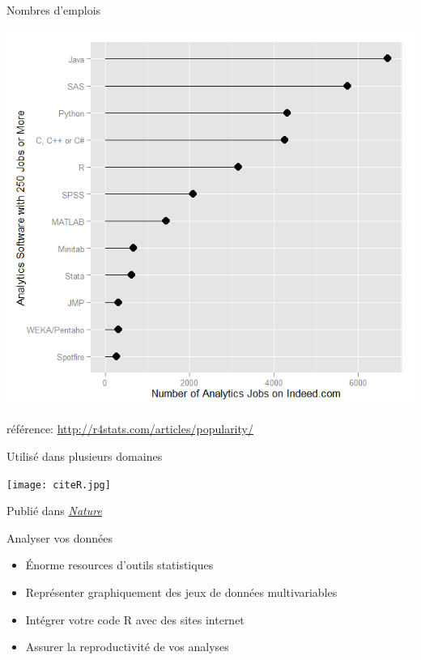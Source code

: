 \documentclass[11pt]{beamer}\usepackage[]{graphicx}\usepackage[]{color}
\begin{document}
\begin{frame}{Nombres d'emplois}

\begin{center}
\includegraphics[scale=0.47]{jobs.png}
\end{center}

\vspace{0.05in}

r\'{e}f\'{e}rence: \href{http://r4stats.com/articles/popularity/}{http://r4stats.com/articles/popularity/}\\

\end{frame}



\begin{frame}{Utilis\'{e} dans plusieurs domaines}

\begin{center}
\texttt{[image: citeR.jpg]}
\end{center}

\vspace{0.05in}

Publi\'{e} dans \href{http://www.nature.com/news/programming-tools-adventures-with-r-1.16609}{\textit{Nature}}
\end{frame}


\begin{frame}{Analyser vos données}
\begin{itemize}
  \setlength\itemsep{2em}
\item \'{E}norme resources d'outils statistiques
\item Représenter graphiquement des jeux de données multivariables
\item Intégrer votre code R avec des sites internet
\item Assurer la reproductivité de vos analyses
\end{itemize}
\end{frame}
\end{document}
